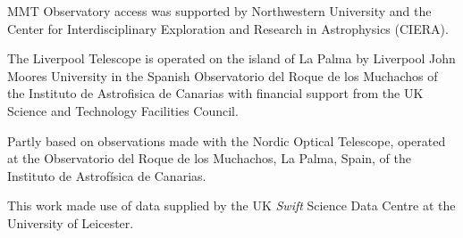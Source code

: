 \documentclass[twocolumn]{aastex63}
\begin{document}
MMT Observatory access was supported by Northwestern University and the
Center for Interdisciplinary Exploration and Research in Astrophysics (CIERA).

The Liverpool Telescope is operated on the island of La Palma by Liverpool
John Moores University in the Spanish Observatorio del Roque de los Muchachos
of the Instituto de Astrofisica de Canarias with financial support from the UK
Science and Technology Facilities Council.

Partly based on observations made with the Nordic Optical Telescope, operated
at the Observatorio del Roque de los Muchachos, La Palma, Spain, of the
Instituto de Astrof\'isica de Canarias.

This work made use of data supplied by the UK \textit{Swift} Science Data
Centre at the University of Leicester.







\end{document}
